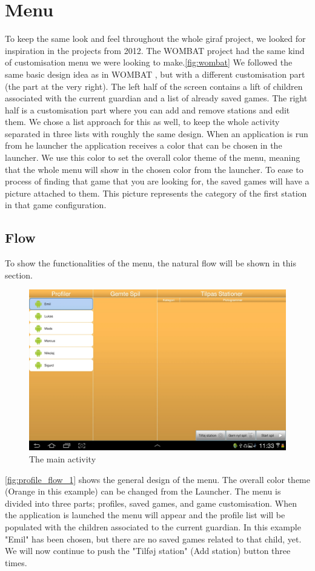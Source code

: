 \section{Menu}
To keep the same look and feel throughout the whole \ac{giraf} project, we looked for inspiration in the projects from 2012. The WOMBAT  project had the same kind of customisation menu we were looking to make.\autoref{fig:wombat} We followed the same basic design idea as in WOMBAT , but with a different customisation part (the part at the very right). The left half of the screen contains a lift of children associated with the current guardian and a list of already saved games. The right half is a customisation part where you can add and remove stations and edit them. We chose a list approach for this as well, to keep the whole activity separated in three lists with roughly the same design.
When an application is run from he launcher the application receives a color that can be chosen in the launcher. We use this color to set the overall color theme of the menu, meaning that the whole menu will show in the chosen color from the launcher.
To ease to process of finding that game that you are looking for, the saved games will have a picture attached to them. This picture represents the category of the first station in that game configuration.

\subsection{Flow}
To show the functionalities of the menu, the natural flow will be shown in this section.
\begin{figure}[H]
\centering
\includegraphics[width=0.9\linewidth]{img/screenshots/profile_flow_1.jpg}%
\caption{The main activity}
\label{fig:profile_flow_1}
\end{figure}
\autoref{fig:profile_flow_1} shows the general design of the menu. The overall color theme (Orange in this example) can be changed from the Launcher. The menu is divided into three parts; profiles, saved games, and game customisation. When the application is launched the menu will appear and the profile list will be populated with the children associated to the current guardian. In this example "Emil" has been chosen, but there are no saved games related to that child, yet.
We will now continue to push the "Tilføj station" (Add station) button three times.

